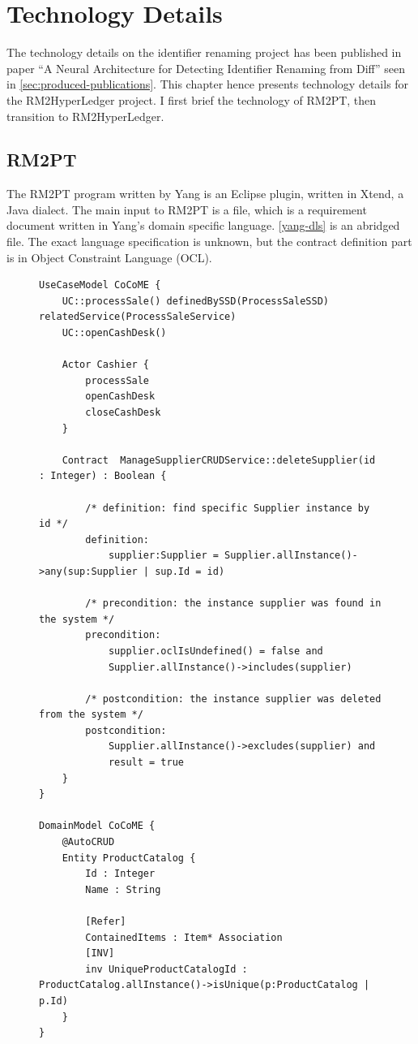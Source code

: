 \chapter{Technology Details}

The technology details on the identifier renaming project has been published in paper ``A Neural Architecture for Detecting Identifier Renaming from Diff'' seen in \autoref{sec:produced-publications}.
This chapter hence presents technology details for the RM2HyperLedger project. I first brief the technology of RM2PT, then transition to RM2HyperLedger.

\section{RM2PT}

The RM2PT program written by Yang is an Eclipse plugin, written in Xtend, a Java dialect. The main input to RM2PT is a  file, which is a requirement document written in Yang's  domain specific language. \autoref{yang-dls} is an abridged  file. The exact language specification is unknown, but the contract definition part is in Object Constraint Language (OCL).

\begin{figure}[ht]
\begin{lstlisting}[language={}, breaklines=true, showstringspaces=false, frame=tb, caption={an abridged \code{.remodel} file. The contract definition part is written in OCL.}, label=yang-dls]
UseCaseModel CoCoME {
	UC::processSale() definedBySSD(ProcessSaleSSD) relatedService(ProcessSaleService)
	UC::openCashDesk()

	Actor Cashier {
		processSale
		openCashDesk
		closeCashDesk
	}

	Contract  ManageSupplierCRUDService::deleteSupplier(id : Integer) : Boolean {

		/* definition: find specific Supplier instance by id */
		definition:
			supplier:Supplier = Supplier.allInstance()->any(sup:Supplier | sup.Id = id)

		/* precondition: the instance supplier was found in the system */
		precondition:
			supplier.oclIsUndefined() = false and
			Supplier.allInstance()->includes(supplier)

		/* postcondition: the instance supplier was deleted from the system */
		postcondition:
			Supplier.allInstance()->excludes(supplier) and
			result = true
	}
}

DomainModel CoCoME {
	@AutoCRUD
	Entity ProductCatalog {
		Id : Integer
		Name : String

		[Refer]
		ContainedItems : Item* Association
		[INV]
		inv UniqueProductCatalogId : ProductCatalog.allInstance()->isUnique(p:ProductCatalog | p.Id)
	}
}
\end{lstlisting}
\end{figure}

